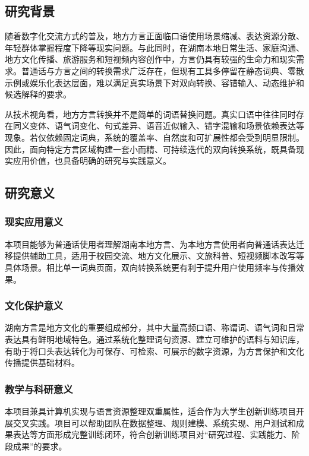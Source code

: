 \documentclass[12pt,a4paper]{ctexart}
\begin{document}
\subsection{研究背景}

随着数字化交流方式的普及，地方方言正面临口语使用场景缩减、表达资源分散、年轻群体掌握程度下降等现实问题。与此同时，在湖南本地日常生活、家庭沟通、地方文化传播、旅游服务和短视频内容创作中，方言仍具有较强的生命力和现实需求。普通话与方言之间的转换需求广泛存在，但现有工具多停留在静态词典、零散示例或娱乐化表达层面，难以满足真实场景下对双向转换、容错输入、动态维护和候选解释的要求。

从技术视角看，地方方言转换并不是简单的词语替换问题。真实口语中往往同时存在同义变体、语气词变化、句式差异、语音近似输入、错字混输和场景依赖表达等现象。若仅依赖固定词典，系统的覆盖率、自然度和可扩展性都会受到明显限制。因此，面向特定方言区域构建一套小而精、可持续迭代的双向转换系统，既具备现实应用价值，也具备明确的研究与实践意义。

\subsection{研究意义}

\subsubsection{现实应用意义}

本项目能够为普通话使用者理解湖南本地方言、为本地方言使用者向普通话表达迁移提供辅助工具，适用于校园交流、地方文化展示、文旅科普、短视频脚本改写等具体场景。相比单一词典页面，双向转换系统更有利于提升用户使用频率与传播效果。

\subsubsection{文化保护意义}

湖南方言是地方文化的重要组成部分，其中大量高频口语、称谓词、语气词和日常表达具有鲜明地域特色。通过系统化整理词句资源、建立可维护的语料与知识库，有助于将口头表达转化为可保存、可检索、可展示的数字资源，为方言保护和文化传播提供基础材料。

\subsubsection{教学与科研意义}

本项目兼具计算机实现与语言资源整理双重属性，适合作为大学生创新训练项目开展交叉实践。项目可以帮助团队在数据整理、规则建模、系统实现、用户测试和成果表达等方面形成完整训练闭环，符合创新训练项目对“研究过程、实践能力、阶段成果”的要求。
\end{document}
